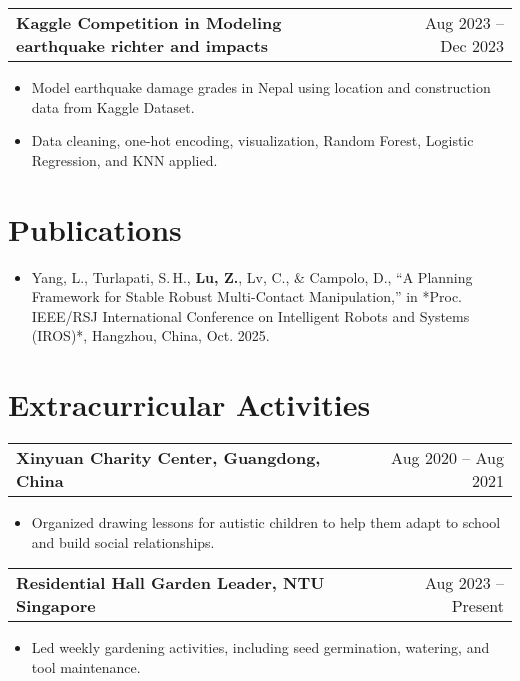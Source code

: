 \documentclass[a4paper,11pt]{article}
\makeatletter
\newenvironment{joblong}[2]
    {
    \begin{tabularx}{\linewidth}{@{}l X r@{}}
    \textbf{#1} & \hfill &  #2 \\[3.75pt]
    \end{tabularx}
    \begin{minipage}[t]{\linewidth}
    \begin{itemize}[nosep,after=\strut, leftmargin=1em, itemsep=3pt,label=--]
    }
    {
    \end{itemize}
    \end{minipage}    
    }
\makeatother
\begin{document}
\begin{joblong}{Kaggle Competition in Modeling earthquake richter and impacts }{Aug 2023 -- Dec 2023}
\item Model earthquake damage grades in Nepal using location and construction data from Kaggle Dataset.
\item Data cleaning, one-hot encoding, visualization, Random Forest, Logistic Regression, and KNN applied.
\end{joblong}

\section{Publications}
\begin{itemize}[nosep,after=\strut, leftmargin=1em, itemsep=3pt,label=--]
\item Yang, L., Turlapati, S.\,H., \textbf{Lu, Z.}, Lv, C., \& Campolo, D., “A Planning Framework for Stable Robust Multi-Contact Manipulation,” in *Proc. IEEE/RSJ International Conference on Intelligent Robots and Systems (IROS)*, Hangzhou, China, Oct. 2025.
\end{itemize}

\section{Extracurricular Activities}
\begin{joblong}{Xinyuan Charity Center, Guangdong, China}{Aug 2020 -- Aug 2021}
\item Organized drawing lessons for autistic children to help them adapt to school and build social relationships.
\end{joblong}

\begin{joblong}{Residential Hall Garden Leader, NTU Singapore}{Aug 2023 -- Present}
\item Led weekly gardening activities, including seed germination, watering, and tool maintenance.
\end{joblong}

\end{document}
